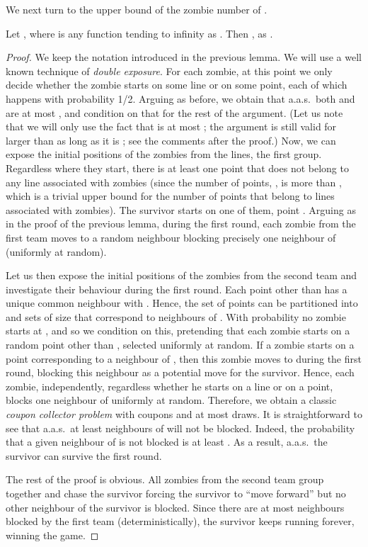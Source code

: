 \documentclass[12pt]{amsart}
\begin{document}
We next turn to the upper bound of the zombie number of .

\begin{lemma}\label{lem2}
Let , where  is any function tending to infinity as . Then , as .
\end{lemma}
\begin{proof}
We keep the notation introduced in the previous lemma. We will use a well known technique of \emph{double exposure}. For each zombie, at this point we only decide whether the zombie starts on some
line or on some point, each of which happens with probability 1/2. Arguing as before, we obtain that a.a.s.\ both  and  are at most , and condition on that for the rest of the argument. (Let us note that we will only use the fact
that  is at most ; the argument is still valid for  larger than  as long as it is ; see the comments after the proof.) Now, we can expose the initial positions of the zombies
from the lines, the first group. Regardless where they start, there is at least one point that does not belong to any line associated with zombies (since the number of points, , is more than
, which is a trivial upper bound for the number of points that belong to lines associated with zombies). The survivor starts on one of them, point .
Arguing as in the proof of the previous lemma, during the first round, each zombie from the first team moves to a random neighbour blocking precisely one neighbour of  (uniformly at random).

Let us then expose the initial positions of the zombies from the second team and investigate their behaviour during the first round. Each point other than  has a unique common neighbour with .
Hence, the set of points can be partitioned into  and  sets of size  that correspond to  neighbours of . With probability  no zombie starts at , and
so we condition on this, pretending that each zombie starts on a random point other than , selected uniformly at random. If a zombie starts on a point corresponding to a neighbour  of ,
then this zombie moves to  during the first round, blocking this neighbour as a potential move for the survivor. Hence, each zombie, independently, regardless whether he starts on a line or on a
point, blocks one neighbour of  uniformly at random. Therefore, we obtain a classic \emph{coupon collector problem} with  coupons and at most  draws. It is straightforward to see that a.a.s.\ at least  neighbours of  will not be blocked. Indeed, the probability that a given neighbour of  is not blocked is at least . As a result, a.a.s.\ the survivor can survive the first round.

The rest of the proof is obvious. All zombies from the second team group together and chase the survivor forcing the survivor to ``move forward'' but no other neighbour of the survivor is blocked.
Since there are at most  neighbours blocked by the first team (deterministically), the survivor keeps running forever, winning the game.
\end{proof}
\end{document}
